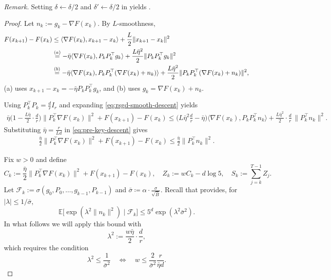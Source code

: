\documentclass[10pt]{article}
\begin{document}
\noindent\emph{Remark.} 
Setting $\delta\leftarrow \delta/2$ and $\delta'\leftarrow \delta/2$ in  yields .

\begin{proof}
Let $n_k:=g_k-\nabla F(x_k)$. By $L$-smoothness,
\begin{align}
F(x_{k+1})-F(x_k)
&\le \langle \nabla F(x_k),x_{k+1}-x_k\rangle+\frac{L}{2}\|x_{k+1}-x_k\|^2 \notag\\
&\overset{(a)}{=} -\bar{\eta}\langle \nabla F(x_k),P_kP_k^\top g_k\rangle
+\frac{L\bar{\eta}^2}{2}\|P_kP_k^\top g_k\|^2 \notag\\
&\overset{(b)}{=} -\bar{\eta}\langle \nabla F(x_k),P_kP_k^\top (\nabla F(x_k)+n_k)\rangle
+\frac{L\bar{\eta}^2}{2}\|P_kP_k^\top (\nabla F(x_k)+n_k)\|^2,
\label{eq:rsgd-smooth-descent}
\end{align}
(a)\; uses $x_{k+1}-x_k=-\bar{\eta} P_kP_k^\top g_k$, and
(b)\; uses $g_k=\nabla F(x_k)+n_k$.

Using $P_k^\top P_k=\frac{d}{r}I_r$ and expanding \eqref{eq:rsgd-smooth-descent} yields
\begin{align}
\bar{\eta}\Big(1-\frac{L\bar{\eta}}{2}\cdot\frac{d}{r}\Big)\|P_k^\top\nabla F(x_k)\|^2
+F(x_{k+1})-F(x_k)
\le
\Big(L\bar{\eta}^2\frac{d}{r}-\bar{\eta}\Big)\langle \nabla F(x_k),P_kP_k^\top n_k\rangle
+\frac{L\bar{\eta}^2}{2}\cdot\frac{d}{r}\,\|P_k^\top n_k\|^2.
\label{eq:pre-key-descent}
\end{align}
Substituting $\bar{\eta}=\frac{r}{Ld}$ in \eqref{eq:pre-key-descent} gives
\begin{align}
\frac{\bar{\eta}}{2}\|P_k^\top\nabla F(x_k)\|^2 +F(x_{k+1})-F(x_k)
\le \frac{\bar{\eta}}{2}\|P_k^\top n_k\|^2.
\label{eq:key-descent}
\end{align}

Fix $w>0$ and define
\[
C_k := \frac{\bar{\eta}}{2}\|P_k^\top\nabla F(x_k)\|^2 +F(x_{k+1})-F(x_k),\quad
Z_k := w C_k - d\log 5,\quad
S_k := \sum_{j=k}^{T-1} Z_j.
\]
Let $\mathcal{F}_k:=\sigma(g_0,P_0,\ldots,g_{k-1},P_{k-1})$ and $\bar{\sigma}\coloneqq \alpha\cdot \frac{\sigma}{\sqrt{\bar{B}}}$.
Recall that  provides, for $|\lambda|\le 1/\bar{\sigma}$,
\[
\mathbb{E}\big[\exp(\lambda^2\|n_k\|^2)\mid \mathcal{F}_k\big]
\le 5^d\exp(\lambda^2\bar{\sigma}^2).
\]
In what follows we will apply this bound with
\begin{equation}
\lambda^2 := \frac{w\bar{\eta}}{2}\cdot\frac{d}{r},
\label{eq:lambda-choice}
\end{equation}
which requires the condition
\begin{equation}
\lambda^2 \le \frac{1}{\bar{\sigma}^2}
\quad\Longleftrightarrow\quad
w\le \frac{2}{\bar{\sigma}^2}\frac{r}{\bar{\eta} d}.
\label{eq:w-condition}
\end{equation}


\end{proof}
\end{document}
